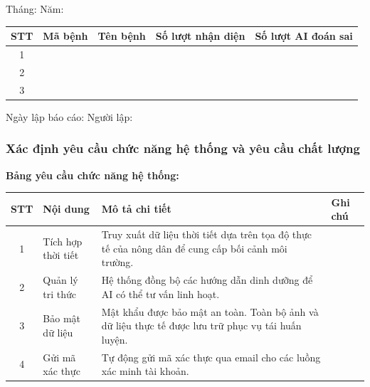 \documentclass[12pt,a4paper]{article}
\begin{document}
\noindent Tháng: \dotfill \quad Năm: \dotfill

\begin{longtable}{|c|l|p{4cm}|p{3cm}|p{3cm}|}
    \hline
    \rowcolor{headerblue}
    \textbf{STT} & \textbf{Mã bệnh} & \textbf{Tên bệnh} & \textbf{Số lượt nhận diện} & \textbf{Số lượt AI đoán sai} \\
    \hline
    1            &                  &                   &                            &                              \\
    \hline
    2            &                  &                   &                            &                              \\
    \hline
    3            &                  &                   &                            &                              \\
    \hline
\end{longtable}
\noindent Ngày lập báo cáo: \dotfill \quad Người lập: \dotfill

\hrulefill

\subsubsection{Xác định yêu cầu chức năng hệ thống và yêu cầu chất lượng}

\textbf{Bảng yêu cầu chức năng hệ thống:}
\begin{longtable}{|c|l|p{9.5cm}|l|}
    \hline
    \rowcolor{headerblue}
    \textbf{STT} & \textbf{Nội dung}  & \textbf{Mô tả chi tiết}                                                                            & \textbf{Ghi chú} \\
    \hline
    \endhead
    1            & Tích hợp thời tiết & Truy xuất dữ liệu thời tiết dựa trên tọa độ thực tế của nông dân để cung cấp bối cảnh môi trường.  &                  \\
    \hline
    2            & Quản lý tri thức   & Hệ thống đồng bộ các hướng dẫn dinh dưỡng để AI có thể tư vấn linh hoạt.                           &                  \\
    \hline
    3            & Bảo mật dữ liệu    & Mật khẩu được bảo mật an toàn. Toàn bộ ảnh và dữ liệu thực tế được lưu trữ phục vụ tái huấn luyện. &                  \\
    \hline
    4            & Gửi mã xác thực    & Tự động gửi mã xác thực qua email cho các luồng xác minh tài khoản.                                &                  \\
    \hline
\end{longtable}
\end{document}
